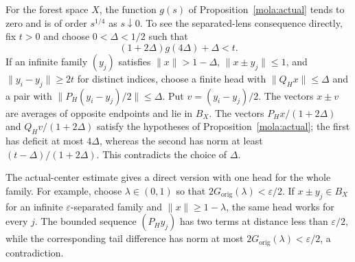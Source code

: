 For the forest space $X$, the function $g(s)$ of Proposition~\ref{mola:actual} tends to zero and is of order $s^{1/4}$ as
$s\downarrow0$.  To see the separated-lens consequence directly,
fix $t>0$ and choose $0<\Delta<1/2$ such that
\[
 (1+2\Delta)g(4\Delta)+\Delta<t.
\]
If an infinite family $(y_j)$ satisfies $\|x\|>1-\Delta$,
$\|x\pm y_j\|\le1$, and $\|y_i-y_j\|\ge2t$ for distinct indices,
choose a finite head with
$\|Q_Hx\|\le\Delta$ and a pair with
$\|P_H(y_i-y_j)/2\|\le\Delta$.  Put $v=(y_i-y_j)/2$.
The vectors $x\pm v$ are averages of opposite endpoints and lie in $B_X$.
The vectors $P_Hx/(1+2\Delta)$ and $Q_Hv/(1+2\Delta)$ satisfy the
hypotheses of Proposition~\ref{mola:actual}; the first has deficit
at most $4\Delta$, whereas the second has norm at least
$(t-\Delta)/(1+2\Delta)$.  This contradicts the choice of $\Delta$.

The actual-center estimate gives a direct version with one head for the whole family.
For example, choose $\lambda\in(0,1)$ so that
$2G_{\mathrm{orig}}(\lambda)<\varepsilon/2$.  If $x\pm y_j\in B_X$ for an
infinite $\varepsilon$-separated family and
$\|x\|\ge1-\lambda$, the same head works for every $j$.
The bounded sequence $(P_Hy_j)$ has two terms at distance less
than $\varepsilon/2$, while the corresponding tail difference has
norm at most $2G_{\mathrm{orig}}(\lambda)<\varepsilon/2$, a contradiction.
